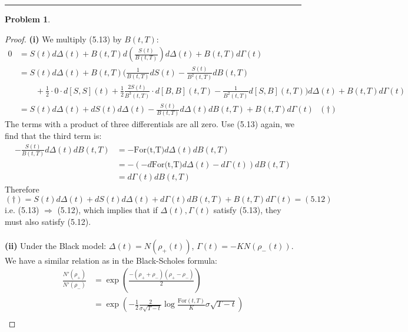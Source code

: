 \documentclass[a4paper, 10pt]{article}
\theoremstyle{definition}
\newtheorem{problem}{Problem}
\theoremstyle{hSol}
\begin{document}
\noindent\rule{16cm}{0.4pt}
\begin{problem} 
\end{problem}
\begin{proof} \textbf{(i)} We multiply (5.13) by $B(t,T)$:
\begin{equation}
   \begin{split}
     0 &= S(t)d\Delta(t) +  B(t,T)d\left(\frac{S(t)}{B(t,T)}\right) d\Delta(t) + B(t,T)d\Gamma(t) \\
     &= S(t)d\Delta(t) +  B(t,T)\Big(\frac{1}{B(t,T)}dS(t) - \frac{S(t)}{B^2(t,T)}dB(t,T) \\
     &\qquad + \frac{1}{2}\cdot0 \cdot d[S,S](t) +  \frac{1}{2} \frac{2S(t)}{B^3(t,T)} \cdot d[B,B](t,T)- \frac{1}{B^2(t,T)}d[S,B](t,T) \Big) d\Delta(t) + B(t,T)d\Gamma(t) \\
     &=  S(t)d\Delta(t)  + dS(t)d\Delta(t) - \frac{S(t)}{B(t,T)}d\Delta(t)dB(t,T) + B(t,T)d\Gamma(t)~~~(\dag)
   \end{split}
 \end{equation} 
 The terms with a product of three differentials are all zero. Use (5.13) again, we find that the third term is:
 \begin{equation}
  \begin{split}
    - \frac{S(t)}{B(t,T)}d\Delta(t)dB(t,T) &= -\text{For(t,T)}d\Delta(t)dB(t,T)  \\
    &= -\left(-d\text{For(t,T)}d\Delta(t) - d\Gamma(t)\right)dB(t,T) \\
    &= d\Gamma(t)dB(t,T)
  \end{split}
 \end{equation}
 Therefore
 \begin{equation}
   (\dag) = S(t)d\Delta(t)  + dS(t)d\Delta(t) +d\Gamma(t)dB(t,T) + B(t,T)d\Gamma(t) = (5.12)
 \end{equation}
 i.e. (5.13) $\Rightarrow$ (5.12), which implies that if $\Delta(t), \Gamma(t)$ satisfy (5.13), they must also satisfy (5.12).\\
 ~\\
\textbf{(ii)} Under the Black model: $\Delta(t)=N(\rho_+(t))$, $\Gamma(t)=-KN(\rho_-(t))$. We have a similar relation as in the Black-Scholes formula:
\begin{equation}
  \begin{split}
    \frac{N'(\rho_+)}{N'(\rho_-)} &= \exp\left(\frac{-(\rho_++\rho_-)(\rho_+-\rho_-)}{2}\right) \\
    &=\exp\left(-\frac{1}{2}\frac{2}{\sigma\sqrt{T-t}}\log\frac{\text{For}(t,T)}{K}\sigma\sqrt{T-t}\right)\\

\end{split}
\end{equation}
\end{proof}
\end{document}
